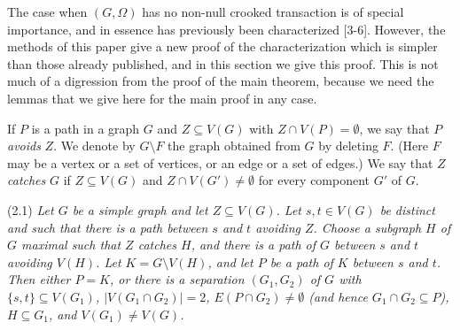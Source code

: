 

The case when $(G, \Omega)$ has no non-null crooked transaction is of special importance, and in essence has previously been characterized [3-6]. However, the methods of this paper give a new proof of the characterization which is simpler than those already published, and in this section we give this proof. This is not much of a digression from the proof of the main theorem, because we need the lemmas that we give here for the main proof in any case.

If $P$ is a path in a graph $G$ and $Z \subseteq V(G)$ with $Z \cap V(P) = \emptyset$, we say that $P$ \textit{avoids} $Z$. We denote by $G \setminus F$ the graph obtained from $G$ by deleting $F$. (Here $F$ may be a vertex or a set of vertices, or an edge or a set of edges.) We say that $Z$ \textit{catches} $G$ if $Z \subseteq V(G)$ and $Z \cap V(G') \ne \emptyset$ for every component $G'$ of $G$.

\stmt
(2.1) \textit{Let $G$ be a simple graph and let $Z \subseteq V(G)$. Let $s, t \in V(G)$ be distinct and such that there is a path between $s$ and $t$ avoiding $Z$. Choose a subgraph $H$ of $G$ maximal such that $Z$ catches $H$, and there is a path of $G$ between $s$ and $t$ avoiding $V(H)$. Let $K = G \setminus V(H)$, and let $P$ be a path of $K$ between $s$ and $t$. Then either $P = K$, or there is a separation $(G_1, G_2)$ of $G$ with $\{s, t\} \subseteq V(G_1)$, $|V(G_1 \cap G_2)| = 2$, $E(P \cap G_2) \ne \emptyset$ (and hence $G_1 \cap G_2 \subseteq P$), $H \subseteq G_1$, and $V(G_1) \ne V(G)$.}
